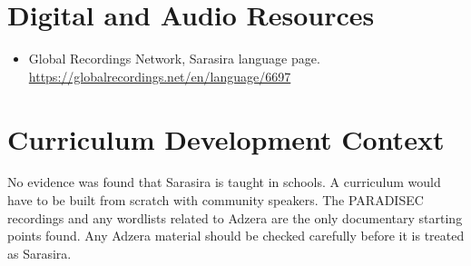 \documentclass[12pt]{article}
\begin{document}
\section{Digital and Audio Resources}
\begin{itemize}
\item Global Recordings Network, Sarasira language page. \url{https://globalrecordings.net/en/language/6697}
\end{itemize}

\section{Curriculum Development Context}
No evidence was found that Sarasira is taught in schools. A curriculum would have to be built from scratch with community speakers. The PARADISEC recordings and any wordlists related to Adzera are the only documentary starting points found. Any Adzera material should be checked carefully before it is treated as Sarasira.
\end{document}
